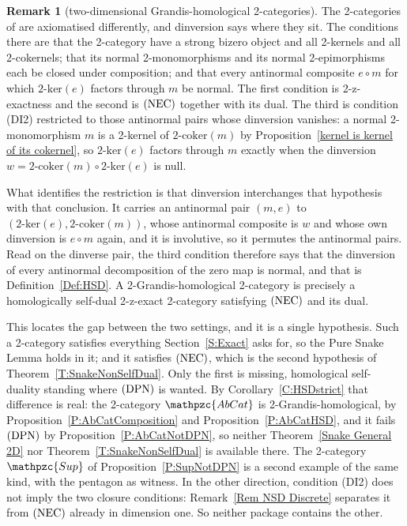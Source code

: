 \documentclass[reqno,a4paper]{amsart}
\numberwithin{equation}{section}
\theoremstyle{plain}
\theoremstyle{definition}
\newtheorem{remark}[subsection]{Remark}
\def\nameit#1{\textrm{#1}~}
\def\thex{\nameit{Theorem}}
\def\prox{\nameit{Proposition}}
\def\corx{\nameit{Corollary}}
\def\defx{\nameit{Definition}}
\def\remx{\nameit{Remark}}
\newcommand{\comp}{\circ}
\newcommand{\catfont}[1]{\ensuremath{\mathpzc{#1}}\xspace}
\newcommand{\AbCat}{\catfont{AbCat}}
\newcommand{\Sup}{\catfont{Sup}}
\renewcommand{\1}{\onecat{1}}
\newcommand{\DPN}{\textup{(DPN)}}
\newcommand{\NEC}{\textup{(NEC)}}
\newcommand{\twoker}{\ensuremath{2\text{-}\mathrm{ker}}}
\newcommand{\twocoker}{\ensuremath{2\text{-}\mathrm{coker}}}
\begin{document}
\begin{remark}[two-dimensional Grandis-homological 2-categories]\label{Rem Grandis}
	The 2-categories of \cite{CavJanMesRei26} are axiomatised differently, and dinversion says where they sit. The conditions there are that the 2-category have a strong bizero object and all 2-kernels and all 2-cokernels; that its normal 2-monomorphisms and its normal 2-epimorphisms each be closed under composition; and that every antinormal composite \(e\comp m\) for which \(\twoker(e)\) factors through \(m\) be normal. The first condition is 2-z-exactness and the second is \(\NEC\) together with its dual. The third is condition \textup{(DI2)} restricted to those antinormal pairs whose dinversion vanishes: a normal 2-monomorphism \(m\) is a 2-kernel of \(\twocoker(m)\) by \prox\ref{kernel is kernel of its cokernel}, so \(\twoker(e)\) factors through \(m\) exactly when the dinversion \(w=\twocoker(m)\comp\twoker(e)\) is null.

	What identifies the restriction is that dinversion interchanges that hypothesis with that conclusion. It carries an antinormal pair \((m,e)\) to \((\twoker(e),\twocoker(m))\), whose antinormal composite is \(w\) and whose own dinversion is \(e\comp m\) again, and it is involutive, so it permutes the antinormal pairs. Read on the dinverse pair, the third condition therefore says that the dinversion of every antinormal decomposition of the zero map is normal, and that is \defx\ref{Def:HSD}. A 2-Grandis-homological 2-category is precisely a homologically self-dual 2-z-exact 2-category satisfying \(\NEC\) and its dual.

	This locates the gap between the two settings, and it is a single hypothesis. Such a 2-category satisfies everything Section~\ref{S:Exact} asks for, so the Pure Snake Lemma holds in it; and it satisfies \(\NEC\), which is the second hypothesis of \thex\ref{T:SnakeNonSelfDual}. Only the first is missing, homological self-duality standing where \(\DPN\) is wanted. By \corx\ref{C:HSDstrict} that difference is real: the 2-category \(\AbCat\) is 2-Grandis-homological, by \prox\ref{P:AbCatComposition} and \prox\ref{P:AbCatHSD}, and it fails \(\DPN\) by \prox\ref{P:AbCatNotDPN}, so neither \thex\ref{Snake General 2D} nor \thex\ref{T:SnakeNonSelfDual} is available there. The 2-category \(\Sup\) of \prox\ref{P:SupNotDPN} is a second example of the same kind, with the pentagon as witness. In the other direction, condition \textup{(DI2)} does not imply the two closure conditions: \remx\ref{Rem NSD Discrete} separates it from \(\NEC\) already in dimension one. So neither package contains the other.
\end{remark}
\end{document}
